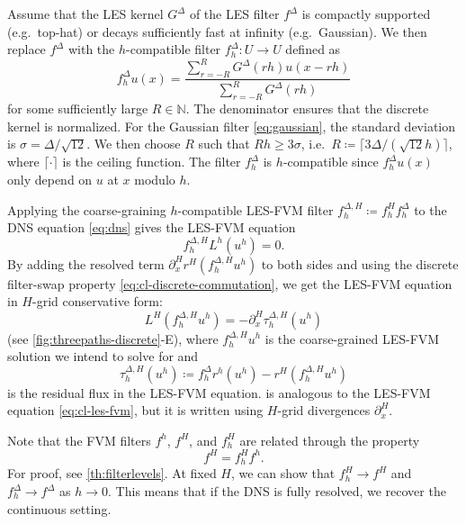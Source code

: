 \documentclass[preprint,twocolumn,5p]{elsarticle}
\begin{document}
Assume that the LES kernel $G^\Delta$ of the LES filter $f^\Delta$ is compactly
supported (e.g.\ top-hat) or decays sufficiently fast at infinity
(e.g.\ Gaussian).
We then replace $f^\Delta$ with the
$h$-compatible filter $f^\Delta_h : U \to U$ defined as
\begin{equation}
    f^\Delta_h u(x)
    = \frac{
        \sum_{r = -R}^R G^\Delta(r h) u(x - r h)
    }{
        \sum_{r = -R}^R G^\Delta(r h)
    }
\end{equation}
for some sufficiently large $R \in \mathbb{N}$.
The denominator ensures that the discrete kernel is normalized.
For the Gaussian filter \eqref{eq:gaussian}, the standard deviation is
$\sigma = \Delta / \sqrt{12}$. We then choose $R$ such that
$R h \geq 3 \sigma$, i.e.\
$R \coloneq \lceil 3 \Delta / (\sqrt{12} h) \rceil$, where
$\lceil \cdot \rceil$ is the ceiling function.
The filter $f^\Delta_h$ is $h$-compatible since
$f^\Delta_h u(x)$ only depend on $u$ at $x$ modulo $h$.

Applying the coarse-graining $h$-compatible LES-FVM filter
$f^{\Delta, H}_h \coloneq f^H_h f^\Delta_h$
to the DNS equation \eqref{eq:dns} gives the LES-FVM equation
\begin{equation}
    f^{\Delta, H}_h L^h(u^h) = 0.
\end{equation}
By adding the resolved term $\partial^H_x r^H(f^{\Delta, H}_h u^h)$
to both sides and using the discrete filter-swap property
\eqref{eq:cl-discrete-commutation},
we get the LES-FVM equation in $H$-grid conservative form:
\begin{equation} \label{eq:cl-les-fvm-twogrid}
    L^H(f^{\Delta, H}_h u^h) = - \partial^H_x \tau^{\Delta, H}_h(u^h)
\end{equation}
(see \cref{fig:threepaths-discrete}-E),
where $f^{\Delta, H}_h u^h$ is the coarse-grained LES-FVM solution
we intend to solve for and
\begin{equation}
    \boxed{
        \tau^{\Delta, H}_h(u^h) \coloneq
        f^\Delta_h r^h(u^h) - r^H\left(f^{\Delta, H}_h u^h\right)
    }
\end{equation}
is the residual flux in the LES-FVM equation.
 is analogous to the LES-FVM equation
\eqref{eq:cl-les-fvm}, but it is
written using $H$-grid divergences $\partial^H_x$.

Note that the FVM filters $f^h$, $f^H$, and $f^H_h$ are related through the
property
\begin{equation}
    f^H = f^H_h f^h.
\end{equation}
For proof, see \cref{th:filterlevels}.
At fixed $H$, we can show that $f^H_h \to f^H$ and $f^\Delta_h \to f^\Delta$
as $h \to 0$.
This means that if the DNS is fully resolved, we recover the continuous
setting.
\end{document}
